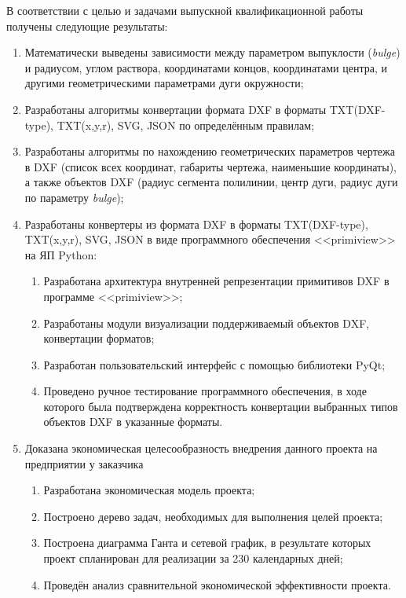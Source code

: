 \Conclusion %

В соответствии с целью и задачами выпускной квалификационной работы получены следующие результаты:

\begin{enumerate}[1.]
	\item Математически выведены зависимости между параметром выпуклости (\textit{bulge}) и радиусом, углом раствора, координатами концов, координатами центра, и другими геометрическими параметрами дуги окружности;
	\item Разработаны алгоритмы конвертации формата DXF в форматы TXT(DXF-type), TXT(x,y,r), SVG, JSON по определённым правилам;
	\item Разработаны алгоритмы по нахождению геометрических параметров чертежа в DXF (список всех координат, габариты чертежа, наименьшие координаты), а также объектов DXF (радиус сегмента полилинии, центр дуги, радиус дуги по параметру \textit{bulge});
	\item Разработаны конвертеры из формата DXF в форматы TXT(DXF-type), TXT(x,y,r), SVG, JSON в виде программного обеспечения <<primiview>> на ЯП Python:
	\begin{enumerate}[4.1]
		\item Разработана архитектура внутренней репрезентации примитивов DXF в программе <<primiview>>;
		\item Разработаны модули визуализации поддерживаемый объектов DXF, конвертации форматов;
		\item Разработан пользовательский интерфейс с помощью библиотеки PyQt;
		\item Проведено ручное тестирование программного обеспечения, в ходе которого была подтверждена корректность конвертации выбранных типов объектов DXF в указанные форматы.
	\end{enumerate}
	\item Доказана экономическая целесообразность внедрения данного проекта на предприятии у заказчика
	\begin{enumerate}[5.1]
		\item Разработана экономическая модель проекта;
		\item Построено дерево задач, необходимых для выполнения целей проекта;
		\item Построена диаграмма Ганта и сетевой график,  в результате которых проект спланирован для реализации за 230 календарных дней;
		\item Проведён анализ сравнительной экономической эффективности проекта.
	\end{enumerate}
\end{enumerate}

